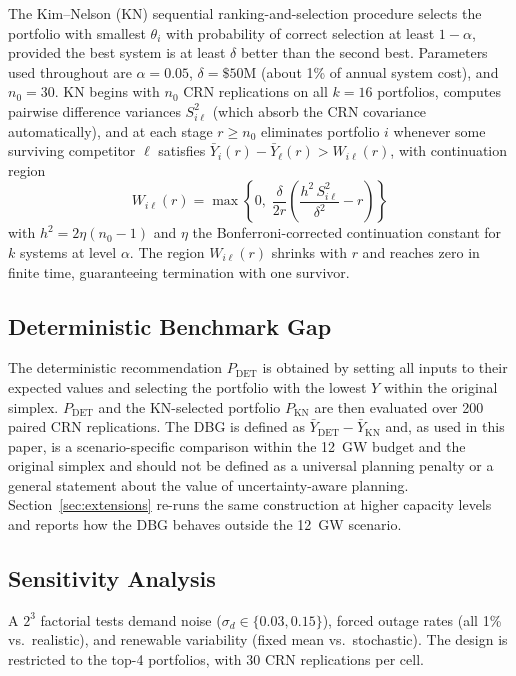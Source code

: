 \documentclass[11pt]{article}
\begin{document}
The Kim--Nelson (KN) sequential ranking-and-selection procedure \citep{KimNelson2001} selects the portfolio with smallest $\theta_i$ with probability of correct selection at least $1 - \alpha$, provided the best system is at least $\delta$ better than the second best. Parameters used throughout are $\alpha = 0.05$, $\delta = \$50$M (about 1\% of annual system cost), and $n_0 = 30$. KN begins with $n_0$ CRN replications on all $k = 16$ portfolios, computes pairwise difference variances $S^2_{i\ell}$ (which absorb the CRN covariance automatically), and at each stage $r \geq n_0$ eliminates portfolio $i$ whenever some surviving competitor $\ell$ satisfies $\bar{Y}_i(r) - \bar{Y}_\ell(r) > W_{i\ell}(r)$, with continuation region
\begin{equation}\label{eq:kn-threshold}
  W_{i\ell}(r) = \max\!\left\{0,\; \frac{\delta}{2r}\!\left(\frac{h^2\, S^2_{i\ell}}{\delta^2} - r\right)\right\}
\end{equation}
with $h^2 = 2\eta(n_0 - 1)$ and $\eta$ the Bonferroni-corrected continuation constant for $k$ systems at level $\alpha$. The region $W_{i\ell}(r)$ shrinks with $r$ and reaches zero in finite time, guaranteeing termination with one survivor.

\subsection{Deterministic Benchmark Gap}

The deterministic recommendation $P_{\text{DET}}$ is obtained by setting all inputs to their expected values and selecting the portfolio with the lowest $Y$ within the original simplex. $P_{\text{DET}}$ and the KN-selected portfolio $P_{\text{KN}}$ are then evaluated over 200 paired CRN replications. The DBG is defined as $\bar{Y}_{\text{DET}} - \bar{Y}_{\text{KN}}$ and, as used in this paper, is a scenario-specific comparison within the 12~GW budget and the original simplex and should not be defined as a universal planning penalty or a general statement about the value of uncertainty-aware planning. Section~\ref{sec:extensions} re-runs the same construction at higher capacity levels and reports how the DBG behaves outside the 12~GW scenario.

\subsection{Sensitivity Analysis}

A $2^3$ factorial tests demand noise ($\sigma_d \in \{0.03, 0.15\}$), forced outage rates (all 1\% vs.\ realistic), and renewable variability (fixed mean vs.\ stochastic). The design is restricted to the top-4 portfolios, with 30 CRN replications per cell.
\end{document}
